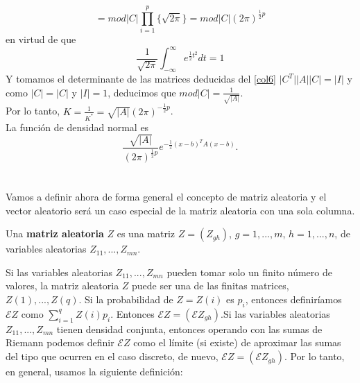\[ = mod \vert C \vert \prod_{i=1}^p \lbrace \sqrt{2 \pi} \rbrace= mod \vert C \vert (2 \pi)^{\frac{1}{2}p} \]
en virtud de que
\[ \frac{1}{\sqrt{2\pi}} \int_{-\infty}^{\infty} e^{\frac{1}{2}t^2}dt=1 \]
Y tomamos el determinante de las matrices deducidas del \autoref{col6} $\vert C^T \vert \vert A \vert \vert C \vert = \vert I \vert$ y como $\vert C \vert= \vert C \vert $ y $\vert I \vert=1$, deducimos que $mod \vert C \vert = \frac{1}{\sqrt{\vert A \vert}}$.\\
Por lo tanto, $K=\frac{1}{K^*}=\sqrt{\vert A \vert} (2\pi)^{-\frac{1}{2}p}$.\\
La función de densidad normal es
\[ \frac{\sqrt{\vert A \vert}}{(2 \pi)^{\frac{1}{2}p}} e^{-\frac{1}{2} (x-b)^T A (x-b)}. \]
\cite{anderson1958introduction}\\\\
Vamos a definir ahora de forma general el concepto de matriz aleatoria y el vector aleatorio será un caso especial de la matriz aleatoria con una sola columna.
\begin{definicion}
Una \textbf{matriz aleatoria} $Z$ es una matriz $Z=(Z_{gh})$, $g=1,...,m$, $h=1,...,n$, de variables aleatorias $Z_{11},...,Z_{mn}$.
\end{definicion}
Si las variables aleatorias $Z_{11},...,Z_{mn}$ pueden tomar solo un finito número de valores, la matriz aleatoria $Z$ puede ser una de las finitas matrices, $Z(1),...,Z(q)$. Si la probabilidad de $Z=Z(i)$ es $p_i$, entonces definiríamos $\mathcal{E}Z$ como $\sum_{i=1}^q Z(i)p_i$. Entonces $\mathcal{E}Z=(\mathcal{E}Z_{gh})$.Si las variables aleatorias $Z_{11},...,Z_{mn}$ tienen densidad conjunta, entonces operando con las sumas de Riemann podemos definir $\mathcal{E}Z$ como el límite (si existe) de aproximar las sumas del tipo que ocurren en el caso discreto, de nuevo, $\mathcal{E}Z=(\mathcal{E}Z_{gh})$. Por lo tanto, en general, usamos la siguiente definición:

